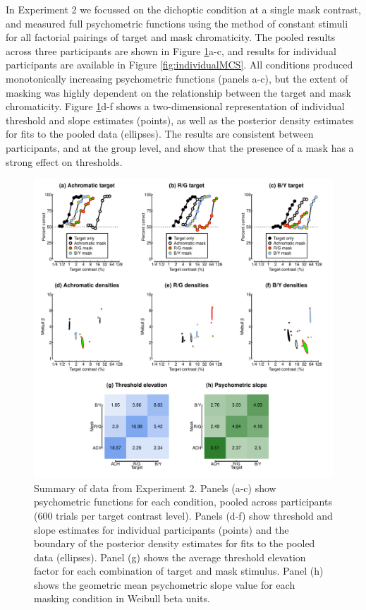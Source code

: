 \documentclass[
]{article}
\begin{document}
In Experiment 2 we focussed on the dichoptic condition at a single mask contrast, and measured full psychometric functions using the method of constant stimuli for all factorial pairings of target and mask chromaticity. The pooled results across three participants are shown in Figure \ref{fig:MCSfig}a-c, and results for individual participants are available in Figure \ref{fig:individualMCS}. All conditions produced monotonically increasing psychometric functions (panels a-c), but the extent of masking was highly dependent on the relationship between the target and mask chromaticity. Figure \ref{fig:MCSfig}d-f shows a two-dimensional representation of individual threshold and slope estimates (points), as well as the posterior density estimates for fits to the pooled data (ellipses). The results are consistent between participants, and at the group level, and show that the presence of a mask has a strong effect on thresholds.

\begin{figure}

{\centering \includegraphics{Figures/MCSdata} 

}

\caption{Summary of data from Experiment 2. Panels (a-c) show psychometric functions for each condition, pooled across participants (600 trials per target contrast level). Panels (d-f) show threshold and slope estimates for individual participants (points) and the boundary of the posterior density estimates for fits to the pooled data (ellipses). Panel (g) shows the average threshold elevation factor for each combination of target and mask stimulus. Panel (h) shows the geometric mean psychometric slope value for each masking condition in Weibull beta units.}\label{fig:MCSfig}
\end{figure}
\end{document}
